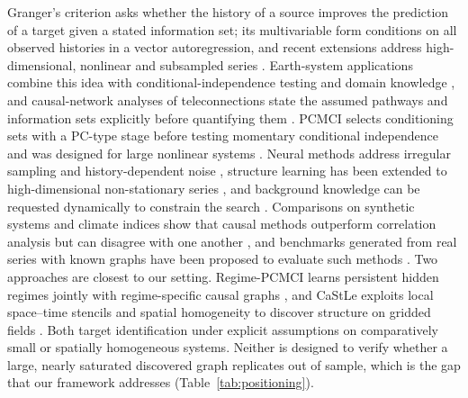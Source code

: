 \documentclass[preprint,12pt]{elsarticle}
\begin{document}
Granger's criterion asks whether the history of a source improves the prediction of a target given a stated information set; its multivariable form conditions on all observed histories in a vector autoregression, and recent extensions address high-dimensional, nonlinear and subsampled series \citep{Shojaie2022Granger}. Earth-system applications combine this idea with conditional-independence testing and domain knowledge \citep{Runge2023TimeSeries}, and causal-network analyses of teleconnections state the assumed pathways and information sets explicitly before quantifying them \citep{Kretschmer2021Pathways}. PCMCI selects conditioning sets with a PC-type stage before testing momentary conditional independence and was designed for large nonlinear systems \citep{Runge2019PCMCI}. Neural methods address irregular sampling \citep{Cheng2023CUTS} and history-dependent noise \citep{Gong2023Rhino}, structure learning has been extended to high-dimensional non-stationary series \citep{Chen2024NonstationaryCausal}, and background knowledge can be requested dynamically to constrain the search \citep{Kitson2025RequestedKnowledge}. Comparisons on synthetic systems and climate indices show that causal methods outperform correlation analysis but can disagree with one another \citep{Docquier2024Comparison}, and benchmarks generated from real series with known graphs have been proposed to evaluate such methods \citep{Cheng2024CausalTime}. Two approaches are closest to our setting. Regime-PCMCI learns persistent hidden regimes jointly with regime-specific causal graphs \citep{Saggioro2020RegimePCMCI}, and CaStLe exploits local space--time stencils and spatial homogeneity to discover structure on gridded fields \citep{Nichol2025CaStLe}. Both target identification under explicit assumptions on comparatively small or spatially homogeneous systems. Neither is designed to verify whether a large, nearly saturated discovered graph replicates out of sample, which is the gap that our framework addresses (Table~\ref{tab:positioning}).
\end{document}
